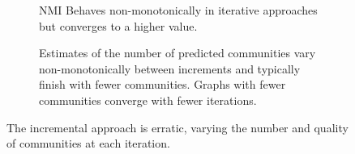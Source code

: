 \begin{figure}[htbp]
    \centering
    \begin{subfigure}[b]{0.45\textwidth}  %
        \centering
        \caption{NMI Behaves non-monotonically in iterative approaches but converges to a higher value.}
        \label{fig:gt-community-nmi}
    \end{subfigure}
    \hfill
    \begin{subfigure}[b]{0.45\textwidth}  %
        \centering
        \caption{Estimates of the number of predicted communities vary non-monotonically between increments and typically finish with fewer communities. Graphs with fewer communities converge with fewer iterations.}
        \label{fig:gt-community-sizes}
    \end{subfigure}
    \caption{The incremental approach is erratic, varying the number and quality of communities at each iteration.}
    \label{fig:cd-results-effectiveness-community-lines}
\end{figure}